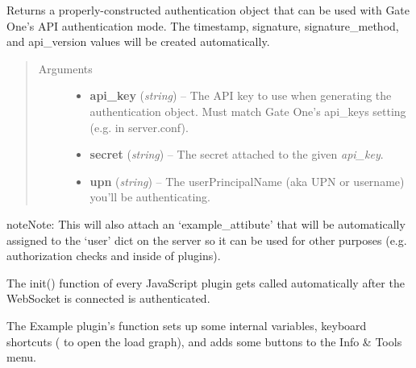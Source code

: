 \documentclass[letterpaper,10pt,openany]{sphinxmanual}
\begin{document}
\begin{fulllineitems}
\label{Applications/terminal/plugin_example:GateOne.Terminal.Example.generateAuthObject}
Returns a properly-constructed authentication object that can be used with Gate One's API authentication mode.  The timestamp, signature, signature\_method, and api\_version values will be created automatically.
\begin{quote}\begin{description}
\item[{Arguments}] \leavevmode\begin{itemize}
\item {} 
\textbf{api\_key} (\emph{string}) -- The API key to use when generating the authentication object.  Must match Gate One's api\_keys setting (e.g. in server.conf).

\item {} 
\textbf{secret} (\emph{string}) -- The secret attached to the given \emph{api\_key}.

\item {} 
\textbf{upn} (\emph{string}) -- The userPrincipalName (aka UPN or username) you'll be authenticating.

\end{itemize}

\end{description}\end{quote}

\begin{notice}{note}{Note:}
This will also attach an `example\_attibute' that will be automatically assigned to the `user' dict on the server so it can be used for other purposes (e.g. authorization checks and inside of plugins).
\end{notice}

\end{fulllineitems}


\begin{fulllineitems}
\label{Applications/terminal/plugin_example:GateOne.Terminal.Example.init}
The init() function of every JavaScript plugin gets called automatically after the WebSocket is connected is authenticated.

The Example plugin's  function sets up some internal variables, keyboard shortcuts ( to open the load graph), and adds some buttons to the Info \& Tools menu.

\end{fulllineitems}
\end{document}

